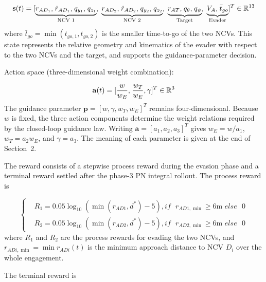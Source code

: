 \begin{equation}
\label{eq:72}
{\mathbf{s}}(t) = {[\underbrace {{r_{A{D_1}}},{\kern 1pt} {{\dot r}_{A{D_1}}},{\kern 1pt} {q_{{y_1}}},{\kern 1pt} {q_{{z_1}}}}_{{\text{NCV 1}}},\;\underbrace {{r_{A{D_2}}},{\kern 1pt} {{\dot r}_{A{D_2}}},{\kern 1pt} {q_{{y_2}}},{\kern 1pt} {q_{{z_2}}}}_{{\text{NCV 2}}},\;\underbrace {{r_{AT}},{\kern 1pt} {q_\theta },{\kern 1pt} {q_\psi }}_{{\text{Target}}},\;\underbrace {{V_A},{\kern 1pt} \bar{t}_{go}}_{{\text{Evader}}}]^T} \in {\mathbb{R}^{13}}
\end{equation}
where $\bar{t}_{go} = \min ({t_{go,1}},{t_{go,2}})$ is the smaller time-to-go of the two NCVs. This state represents the relative geometry and kinematics of the evader with respect to the two NCVs and the target, and supports the guidance-parameter decision.

Action space (three-dimensional weight combination):

\begin{equation}
\label{eq:73}
{\mathbf{a}}(t) = {[\frac{w}{{{w_E}}},{\kern 1pt} \frac{{{w_T}}}{{{w_E}}},\gamma ]^T} \in {\mathbb{R}^3}
\end{equation}
The guidance parameter ${\mathbf{p}} = {[w,\gamma ,w_T,w_E]^T}$ remains four-dimensional. Because $w$ is fixed, the three action components determine the weight relations required by the closed-loop guidance law. Writing ${\mathbf{a}} = {[a_1,a_2,a_3]^T}$ gives $w_E = w/a_1$, $w_T = a_2w_E$, and $\gamma = a_3$. The meaning of each parameter is given at the end of Section~2.

The reward consists of a stepwise process reward during the evasion phase and a terminal reward settled after the phase-3 PN integral rollout. The process reward is

\begin{equation}
\label{eq:74}
\left\{
\begin{aligned}
& {R_1} = 0.05{\log _{10}}(\min ({r_{AD1}},{d^*}) - 5),if{\text{ }}{r_{AD1,\min }} \geqslant 6{\text{m }}else{\text{ }}0 \\
& {R_2} = 0.05{\log _{10}}(\min ({r_{AD2}},{d^*}) - 5),if{\text{ }}{r_{AD2,\min }} \geqslant 6{\text{m }}else{\text{ }}0
\end{aligned}
\right.
\end{equation}
where $R_1$ and $R_2$ are the process rewards for evading the two NCVs, and ${r_{ADi,\min }} = \min {r_{ADi}}(t)$ is the minimum approach distance to NCV ${D_i}$ over the whole engagement.

The terminal reward is

